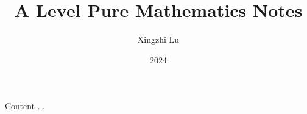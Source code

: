 \documentclass[A4paper]{article}
\title{A Level Pure Mathematics Notes}
\author{Xingzhi Lu}
\date{2024}
\begin{document}
	Content ...
\end{document}
